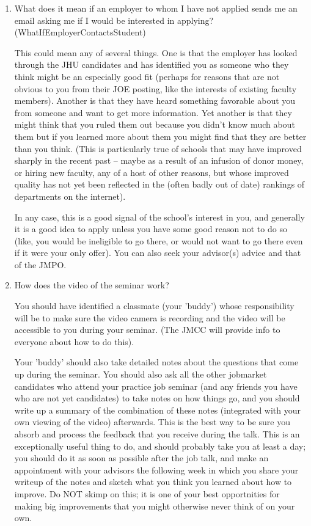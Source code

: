 \documentclass{econtex}
\begin{document}
\begin{enumerate}
\item What does it mean if an employer to whom I have not applied sends me an email asking me if I would be interested in applying?
\ifdvi\hypertarget{WhatIfEmployerContactsStudent}{(WhatIfEmployerContactsStudent)}\fi

This could mean any of several things.  One is that the employer has looked through the JHU candidates and 
has identified you as someone who they think might be an especially good fit (perhaps for reasons that are 
not obvious to you from their JOE posting, like the interests of existing faculty members).  Another is that they
have heard something favorable about you from someone and want to get more information.  Yet another is that they
might think that you ruled them out because you didn't know much about them but if you learned more about them 
you might find that they are better than you think.  (This is particularly true of schools that may have improved sharply 
in the recent past -- maybe as a result of an infusion of donor money, or hiring new faculty, any of a host of other reasons, but whose 
improved quality has not yet been reflected in the (often badly out of date) rankings of departments on the internet).

In any case, this is a good signal of the school's interest in you, and generally it is a good idea to apply
unless you have some good reason not to do so (like, you would be ineligible to go there, or would not want to 
go there even if it were your only offer).  You can also seek your advisor(s) advice and that of the JMPO.


\item How does the video of the seminar work?
  
  You should have identified a classmate (your 'buddy') whose
  responsibility will be to make sure the video camera is recording
  and the video will be accessible to you during your seminar.  (The
  JMCC will provide info to everyone about how to do this).  

  Your 'buddy' should also take detailed notes about the questions
  that come up during the seminar.  You should also ask all the other
  jobmarket candidates who attend your practice job seminar (and any
  friends you have who are not yet candidates) to take notes on how
  things go, and you should write up a summary of the combination of
  these notes (integrated with your own viewing of the video)
  afterwards.  This is the best way to be sure you absorb and process
  the feedback that you receive during the talk.  This is an
  exceptionally useful thing to do, and should probably take you at least
  a day; you should do it as soon as possible after the job talk, and
  make an appointment with your advisors the following week in which
  you share your writeup of the notes and sketch what you think you
  learned about how to improve.  Do NOT skimp on this; it is one of
  your best opportnities for making big improvements that you might
  otherwise never think of on your own.


\end{enumerate}
\end{document}
